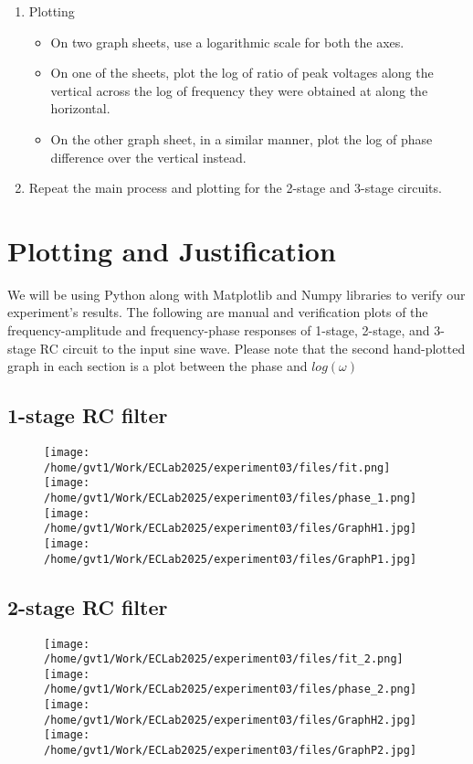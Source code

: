 \documentclass[a4paper,12pt]{article}
\begin{document}
\begin{enumerate}
  \item Plotting
    \begin{itemize}
      \item On two graph sheets, use a logarithmic scale for both the axes. 
      \item On one of the sheets, plot the log of ratio of peak voltages along the vertical across the log of frequency they were obtained at along the horizontal. 
      \item On the other graph sheet, in a similar manner, plot the log of phase difference over the vertical instead. 
    \end{itemize}
  \item Repeat the main process and plotting for the 2-stage and 3-stage circuits.
\end{enumerate}
\section{Plotting and Justification}
We will be using Python along with Matplotlib and Numpy libraries to verify our experiment's results. The following are manual and verification plots of the frequency-amplitude and frequency-phase responses of 1-stage, 2-stage, and 3-stage RC circuit to the input sine wave. Please note that the second hand-plotted graph in each section is a plot between the phase and $log(\omega)$
\subsection{1-stage RC filter}
\begin{figure}[!ht]
\centering
  \texttt{[image: /home/gvt1/Work/ECLab2025/experiment03/files/fit.png]}
  \texttt{[image: /home/gvt1/Work/ECLab2025/experiment03/files/phase\_1.png]}
  \texttt{[image: /home/gvt1/Work/ECLab2025/experiment03/files/GraphH1.jpg]}
  \texttt{[image: /home/gvt1/Work/ECLab2025/experiment03/files/GraphP1.jpg]}
\end{figure}
\subsection{2-stage RC filter}
\begin{figure}[!ht]
\centering
  \texttt{[image: /home/gvt1/Work/ECLab2025/experiment03/files/fit\_2.png]}
  \texttt{[image: /home/gvt1/Work/ECLab2025/experiment03/files/phase\_2.png]}
  \texttt{[image: /home/gvt1/Work/ECLab2025/experiment03/files/GraphH2.jpg]}
  \texttt{[image: /home/gvt1/Work/ECLab2025/experiment03/files/GraphP2.jpg]}
\end{figure}
\end{document}

